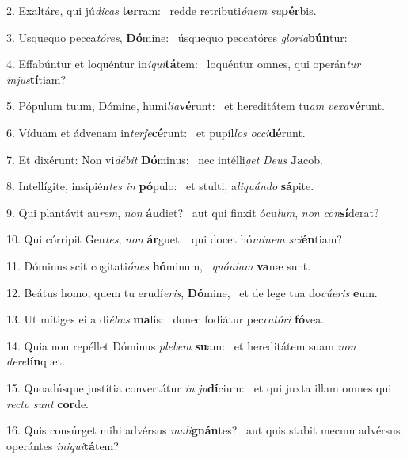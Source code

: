 2. Exaltáre, qui jú\textit{di}\textit{cas} \textbf{ter}ram: \ast\  redde retributi\textit{ó}\textit{nem} \textit{su}\textbf{pér}bis.\

3. Usquequo pecca\textit{tó}\textit{res}, \textbf{Dó}mine: \ast\  úsquequo peccatóres \textit{glo}\textit{ri}\textit{a}\textbf{bún}tur:\

4. Effabúntur et loquéntur in\textit{i}\textit{qui}\textbf{tá}tem: \ast\  loquéntur omnes, qui operán\textit{tur} \textit{in}\textit{jus}\textbf{tí}tiam?\

5. Pópulum tuum, Dómine, humi\textit{li}\textit{a}\textbf{vé}runt: \ast\  et hereditátem tu\textit{am} \textit{ve}\textit{xa}\textbf{vé}runt.\

6. Víduam et ádvenam in\textit{ter}\textit{fe}\textbf{cé}runt: \ast\  et pupíl\textit{los} \textit{oc}\textit{ci}\textbf{dé}runt.\

7. Et dixérunt: Non vi\textit{dé}\textit{bit} \textbf{Dó}minus: \ast\  nec intélli\textit{get} \textit{De}\textit{us} \textbf{Ja}cob.\

8. Intellígite, insipién\textit{tes} \textit{in} \textbf{pó}pulo: \ast\  et stulti, a\textit{li}\textit{quán}\textit{do} \textbf{sá}pite.\

9. Qui plantávit au\textit{rem}, \textit{non} \textbf{áu}diet? \ast\  aut qui finxit ócu\textit{lum}, \textit{non} \textit{con}\textbf{sí}derat?\

10. Qui córripit Gen\textit{tes}, \textit{non} \textbf{ár}guet: \ast\  qui docet hó\textit{mi}\textit{nem} \textit{sci}\textbf{én}tiam?\

11. Dóminus scit cogitati\textit{ó}\textit{nes} \textbf{hó}minum, \ast\  \textit{quón}\textit{i}\textit{am} \textbf{va}næ sunt.\

12. Beátus homo, quem tu erudí\textit{e}\textit{ris}, \textbf{Dó}mine, \ast\  et de lege tua do\textit{cú}\textit{e}\textit{ris} \textbf{e}um.\

13. Ut mítiges ei a di\textit{é}\textit{bus} \textbf{ma}lis: \ast\  donec fodiátur pec\textit{ca}\textit{tó}\textit{ri} \textbf{fó}vea.\

14. Quia non repéllet Dóminus \textit{ple}\textit{bem} \textbf{su}am: \ast\  et hereditátem suam \textit{non} \textit{de}\textit{re}\textbf{lín}quet.\

15. Quoadúsque justítia convertátur \textit{in} \textit{ju}\textbf{dí}cium: \ast\  et qui juxta illam omnes qui \textit{rec}\textit{to} \textit{sunt} \textbf{cor}de.\

16. Quis consúrget mihi advérsus \textit{ma}\textit{li}\textbf{gnán}tes? \ast\  aut quis stabit mecum advérsus operántes \textit{in}\textit{i}\textit{qui}\textbf{tá}tem?\

